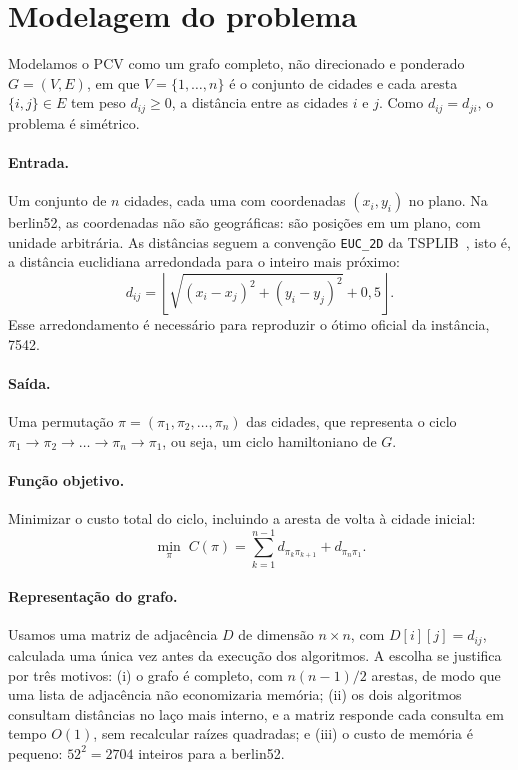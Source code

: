 \documentclass[12pt,a4paper]{article}
\begin{document}
\section{Modelagem do problema}\label{sec:modelagem}

Modelamos o PCV como um grafo completo, não direcionado e ponderado $G = (V, E)$, em que $V = \{1, \dots, n\}$ é o conjunto de cidades e cada aresta $\{i, j\} \in E$ tem peso $d_{ij} \ge 0$, a distância entre as cidades $i$ e $j$. Como $d_{ij} = d_{ji}$, o problema é simétrico.

\paragraph{Entrada.} Um conjunto de $n$ cidades, cada uma com coordenadas $(x_i, y_i)$ no plano. Na berlin52, as coordenadas não são geográficas: são posições em um plano, com unidade arbitrária. As distâncias seguem a convenção \texttt{EUC\_2D} da TSPLIB~\cite{reinelt1991}, isto é, a distância euclidiana arredondada para o inteiro mais próximo:
\[
  d_{ij} = \left\lfloor \sqrt{(x_i - x_j)^2 + (y_i - y_j)^2} + 0{,}5 \right\rfloor .
\]
Esse arredondamento é necessário para reproduzir o ótimo oficial da instância, 7542.

\paragraph{Saída.} Uma permutação $\pi = (\pi_1, \pi_2, \dots, \pi_n)$ das cidades, que representa o ciclo $\pi_1 \to \pi_2 \to \dots \to \pi_n \to \pi_1$, ou seja, um ciclo hamiltoniano de $G$.

\paragraph{Função objetivo.} Minimizar o custo total do ciclo, incluindo a aresta de volta à cidade inicial:
\[
  \min_{\pi} \; C(\pi) = \sum_{k=1}^{n-1} d_{\pi_k \pi_{k+1}} + d_{\pi_n \pi_1} .
\]

\paragraph{Representação do grafo.} Usamos uma matriz de adjacência $D$ de dimensão $n \times n$, com $D[i][j] = d_{ij}$, calculada uma única vez antes da execução dos algoritmos. A escolha se justifica por três motivos: (i) o grafo é completo, com $n(n-1)/2$ arestas, de modo que uma lista de adjacência não economizaria memória; (ii) os dois algoritmos consultam distâncias no laço mais interno, e a matriz responde cada consulta em tempo $O(1)$, sem recalcular raízes quadradas; e (iii) o custo de memória é pequeno: $52^2 = 2704$ inteiros para a berlin52.
\end{document}
